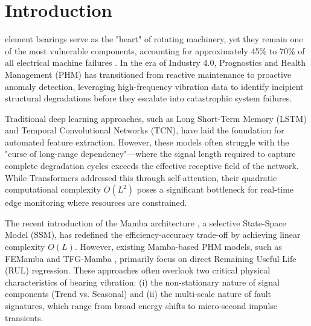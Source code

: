 \documentclass{ieeeaccess}
\begin{document}
{\titlepgskip=0pt

\maketitle

\section{Introduction}
\label{sec:introduction}

 element bearings serve as the "heart" of rotating machinery, yet they remain one of the most vulnerable components, accounting for approximately 45\% to 70\% of all electrical machine failures \cite{lei2018machinery}. In the era of Industry 4.0, Prognostics and Health Management (PHM) has transitioned from reactive maintenance to proactive anomaly detection, leveraging high-frequency vibration data to identify incipient structural degradations before they escalate into catastrophic system failures.

Traditional deep learning approaches, such as Long Short-Term Memory (LSTM) and Temporal Convolutional Networks (TCN), have laid the foundation for automated feature extraction. However, these models often struggle with the "curse of long-range dependency"—where the signal length required to capture complete degradation cycles exceeds the effective receptive field of the network. While Transformers addressed this through self-attention, their quadratic computational complexity $O(L^2)$ poses a significant bottleneck for real-time edge monitoring where resources are constrained.

The recent introduction of the Mamba architecture \cite{gu2023mamba}, a selective State-Space Model (SSM), has redefined the efficiency-accuracy trade-off by achieving linear complexity $O(L)$. However, existing Mamba-based PHM models, such as FEMamba \cite{feng2025femamba} and TFG-Mamba \cite{wei2026tfgmamba}, primarily focus on direct Remaining Useful Life (RUL) regression. These approaches often overlook two critical physical characteristics of bearing vibration: (i) the non-stationary nature of signal components (Trend vs. Seasonal) and (ii) the multi-scale nature of fault signatures, which range from broad energy shifts to micro-second impulse transients.

}
\end{document}
